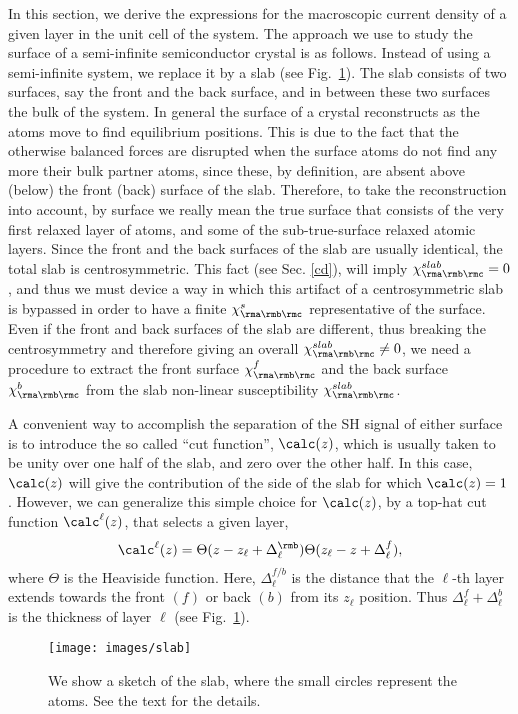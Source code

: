 \documentclass[floatfix,prb,aps,superscriptaddress,11pt,preprint,letterpaper]{revtex4}
\begin{document}
In this section, we derive the expressions for the macroscopic current
density of a given layer in the unit cell of the system.
The approach we use to study the surface of a semi-infinite
semiconductor crystal is as follows. Instead of using a
semi-infinite system, we replace it by a slab (see Fig.~\ref{fslab}).
The slab consists of
two surfaces, say the front and the back surface, and in between these
two surfaces the bulk of the system. 
In
general the surface of a crystal reconstructs as the atoms
move to find equilibrium positions. This is due to the fact that
the otherwise
balanced forces are disrupted when the surface atoms do not find any
more their bulk partner atoms, since these, by definition, are absent
above (below) the front (back) surface of the slab. 
Therefore, to take the reconstruction into account, by surface we really mean
the true surface that consists of the very first relaxed layer of atoms, and
some of the sub-true-surface relaxed atomic layers.
Since the front and the back
surfaces of the slab are usually identical, the total slab is
centrosymmetric. This fact (see Sec. \ref{cd}), will imply $\chi^{slab}_{\rma\rmb\rmc}=0$, and thus we must
device a way in which this artifact of a centrosymmetric slab is
bypassed in order to have a finite $\chi^s_{\rma\rmb\rmc}$ representative of the
surface. Even if the front and back surfaces of the slab 
are different, thus breaking the centrosymmetry and therefore giving an
overall $\chi^{slab}_{\rma\rmb\rmc}\ne 0$, we
need a procedure to extract the front surface $\chi^f_{\rma\rmb\rmc}$
and
the back surface $\chi^b_{\rma\rmb\rmc}$ from the slab non-linear
susceptibility $\chi^{slab}_{\rma\rmb\rmc}$.

A convenient way to accomplish the separation of the SH signal of
either surface is to introduce
the so called
``cut function'', $\calc(z)$, which is usually taken to be unity over one half
of the slab, and zero over the other half.
In this case, $\calc(z)$ will give the contribution of the side of the
slab for which $\calc(z)=1$. However, we can generalize this simple choice
for $\calc(z)$, 
by a top-hat cut function
$\calc^\ell(z)$, that selects a given layer,
\begin{equation}
\label{sz}
\calc^\ell(z)=\Theta(z-z_\ell+\Delta_\ell^{\rmb})
            \Theta(z_\ell-z+\Delta_\ell^f),
\end{equation}
where $\Theta$ is the Heaviside function. Here, $\Delta_\ell^{f/b}$
is the distance that the $\ell$-th layer extends towards the front
$(f)$ or back $(b)$ from its $z_\ell$ position.  Thus
$\Delta_\ell^f+\Delta_\ell^b$ is the thickness of layer $\ell$
(see Fig.~\ref{fslab}).
\begin{figure}[b]
\centering
\texttt{[image: images/slab]}
\caption{
We show a sketch of the slab, where the small
circles represent the atoms. See the text for the details.
}
\label{fslab}
\end{figure}
\end{document}
